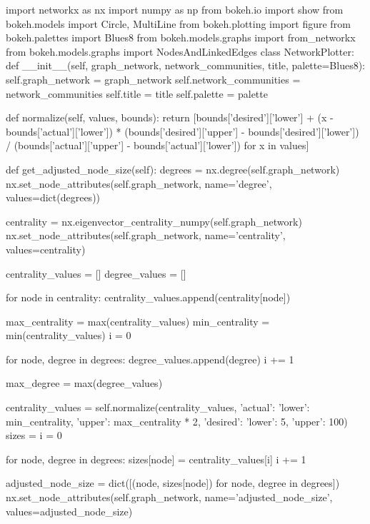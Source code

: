 \begin{codigo}[caption={Exemplo de classe Python para realizar o plot de grafo de redes sociais utilizando o Bokeh}, label={codigo:networkplotter}, language=Python, breaklines=true]
import networkx as nx
import numpy as np
from bokeh.io import show
from bokeh.models import Circle, MultiLine
from bokeh.plotting import figure
from bokeh.palettes import Blues8
from bokeh.models.graphs import from_networkx
from bokeh.models.graphs import NodesAndLinkedEdges
class NetworkPlotter:
    def __init__(self, graph_network, network_communities, title, palette=Blues8):
        self.graph_network = graph_network
        self.network_communities = network_communities
        self.title = title
        self.palette = palette

    def normalize(self, values, bounds):
        return [bounds['desired']['lower'] + (x - bounds['actual']['lower']) * (bounds['desired']['upper'] - bounds['desired']['lower']) / (bounds['actual']['upper'] - bounds['actual']['lower']) for x in values]

    def get_adjusted_node_size(self):
        degrees = nx.degree(self.graph_network)
        nx.set_node_attributes(self.graph_network, name='degree', values=dict(degrees))

        centrality = nx.eigenvector_centrality_numpy(self.graph_network)
        nx.set_node_attributes(self.graph_network, name='centrality', values=centrality)

        centrality_values = []
        degree_values = []

        for node in centrality:
            centrality_values.append(centrality[node])

        max_centrality = max(centrality_values)
        min_centrality = min(centrality_values)
        i = 0

        for node, degree in degrees:
            degree_values.append(degree)
            i += 1

        max_degree = max(degree_values)

        centrality_values = self.normalize(centrality_values, {'actual': {'lower': min_centrality, 'upper': max_centrality * 2}, 'desired': {'lower': 5, 'upper': 100}})
        sizes = {}
        i = 0

        for node, degree in degrees:
            sizes[node] = centrality_values[i]
            i += 1

        adjusted_node_size = dict([(node, sizes[node]) for node, degree in degrees])
        nx.set_node_attributes(self.graph_network, name='adjusted_node_size', values=adjusted_node_size)


\end{codigo}
